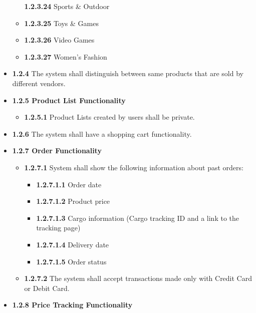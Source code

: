 \documentclass[]{article}
\providecommand{\tightlist}{%
  \setlength{\itemsep}{0pt}\setlength{\parskip}{0pt}}
\begin{document}
\begin{itemize}
\begin{itemize}
                    \textbf{1.2.3.24} Sports \& Outdoor
              \item
                    \textbf{1.2.3.25} Toys \& Games
              \item
                    \textbf{1.2.3.26} Video Games
              \item
                    \textbf{1.2.3.27} Women's Fashion
          \end{itemize}
    \item
          \textbf{1.2.4} The system shall distinguish between same products that
          are sold by different vendors.
    \item
          \textbf{1.2.5 Product List Functionality}

          \begin{itemize}
              \tightlist
              \item
                    \textbf{1.2.5.1} Product Lists created by users shall be private.
          \end{itemize}
    \item
          \textbf{1.2.6} The system shall have a shopping cart functionality.
    \item
          \textbf{1.2.7 Order Functionality}

          \begin{itemize}
              \item
                    \textbf{1.2.7.1} System shall show the following information about
                    past orders:

                    \begin{itemize}
                        \tightlist
                        \item
                              \textbf{1.2.7.1.1} Order date
                        \item
                              \textbf{1.2.7.1.2} Product price
                        \item
                              \textbf{1.2.7.1.3} Cargo information (Cargo tracking ID and a link
                              to the tracking page)
                        \item
                              \textbf{1.2.7.1.4} Delivery date
                        \item
                              \textbf{1.2.7.1.5} Order status
                    \end{itemize}
              \item
                    \textbf{1.2.7.2} The system shall accept transactions made only with
                    Credit Card or Debit Card.
          \end{itemize}
    \item
          \textbf{1.2.8 Price Tracking Functionality}


\end{itemize}
\end{document}
